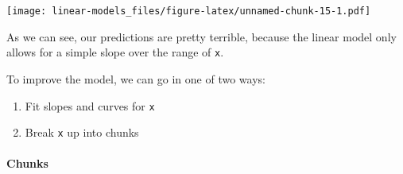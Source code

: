 \documentclass[]{article}
\newenvironment{Shaded}{\begin{snugshade}}{\end{snugshade}}
\newcommand{\KeywordTok}[1]{\textcolor[rgb]{0.13,0.29,0.53}{\textbf{#1}}}
\newcommand{\DataTypeTok}[1]{\textcolor[rgb]{0.13,0.29,0.53}{#1}}
\newcommand{\DecValTok}[1]{\textcolor[rgb]{0.00,0.00,0.81}{#1}}
\newcommand{\StringTok}[1]{\textcolor[rgb]{0.31,0.60,0.02}{#1}}
\newcommand{\OperatorTok}[1]{\textcolor[rgb]{0.81,0.36,0.00}{\textbf{#1}}}
\newcommand{\NormalTok}[1]{#1}
\providecommand{\tightlist}{%
  \setlength{\itemsep}{0pt}\setlength{\parskip}{0pt}}
\let\oldparagraph\paragraph
\renewcommand{\paragraph}[1]{\oldparagraph{#1}\mbox{}}
\theoremstyle{definition}
\theoremstyle{definition}
\theoremstyle{definition}
\theoremstyle{remark}
\begin{document}
\begin{Shaded}
\end{Shaded}

\texttt{[image: linear-models\_files/figure-latex/unnamed-chunk-15-1.pdf]}

As we can see, our predictions are pretty terrible, because the linear
model only allows for a simple slope over the range of \texttt{x}.

To improve the model, we can go in one of two ways:

\begin{enumerate}
\def\labelenumi{\arabic{enumi}.}
\tightlist
\item
  Fit slopes and curves for \texttt{x}
\item
  Break \texttt{x} up into chunks
\end{enumerate}

\paragraph{Chunks}\label{chunks}
\end{document}
